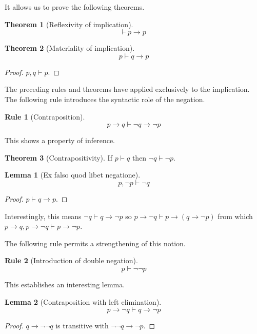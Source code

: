 \documentclass{amsbook}
\newcommand{\infers}{\mathrel\vdash}
\newcommand{\theorem}{\mathord\vdash\medspace}
\newcommand{\then}{\mathrel\rightarrow}
\theoremstyle{definition}
\newtheorem{frule}{Rule}[section]
\newtheorem{thm}{Theorem}[section]
\newtheorem{lmm}{Lemma}[section]
\begin{document}
It allows us to prove the following theorems.

\begin{thm}[Reflexivity of implication]
    $$\theorem p \then p$$
\end{thm}

\begin{thm}[Materiality of implication]
    $$p \infers q \then p$$
    \begin{proof}
        $p, q \infers p$.
    \end{proof}
\end{thm}

The preceding rules and theorems have applied exclusively to the implication. The following rule introduces the syntactic role of the negation.

\begin{frule}[Contraposition]
    $$p \then q \infers \neg q \then \neg p$$
\end{frule}

This shows a property of inference.

\begin{thm}[Contrapositivity]
    If $p \infers q$ then $\neg q \infers \neg p$.
\end{thm}

\begin{lmm}[Ex falso quod libet negatione]
    $$p, \neg p \infers \neg q$$
    \begin{proof}
        $p \infers q \then p$.
    \end{proof}
\end{lmm}

Interestingly, this means $\neg q \infers q \then \neg p$ so $p \then \neg q \infers p \then (q \then \neg p)$ from which $p \then q, p \then \neg q \infers p \then \neg p$.

The following rule permits a strengthening of this notion.

\begin{frule}[Introduction of double negation]
    $$p \infers \neg\neg p$$
\end{frule}

This establishes an interesting lemma.

\begin{lmm}[Contraposition with left elimination]
    $$p \then \neg q \infers q \then \neg p$$
    \begin{proof}
        $q \then \neg\neg q$ is transitive with $\neg\neg q \then \neg p$.
    \end{proof}
\end{lmm}
\end{document}
